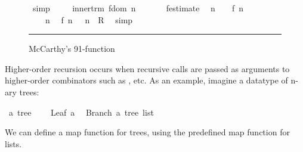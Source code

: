 \begin{isabellebody}
\begin{figure}
\begin{minipage}{0.8\textwidth}
\ simp\ %
\isanewline
\isanewline
\ \ \isamarkupfalse%
\ inner{\isacharunderscore}trm{\isacharcolon}\ {\isachardoublequoteopen}f{}{}{\isacharunderscore}dom\ {\isacharparenleft}n\ {\isacharplus}\ {}{}{\isacharparenright}{\isachardoublequoteclose}\ %
\isanewline
\ \ \isamarkupfalse%
\ f{}{}{\isacharunderscore}estimate\ \isamarkupfalse%
\ {\isachardoublequoteopen}n\ {\isacharplus}\ {}{}\ {\isacharless}\ f{}{}\ {\isacharparenleft}n\ {\isacharplus}\ {}{}{\isacharparenright}\ {\isacharplus}\ {}{}{\isachardoublequoteclose}\ \isacommand{{\isachardot}}\isamarkupfalse%
\isanewline
\ \ \isamarkupfalse%
\ {\isacharbackquoteopen}{\isasymnot}\ {}{}{}\ {\isacharless}\ n{\isacharbackquoteclose}\ \isamarkupfalse%
\ {\isachardoublequoteopen}{\isacharparenleft}f{}{}\ {\isacharparenleft}n\ {\isacharplus}\ {}{}{\isacharparenright}{\isacharcomma}\ n{\isacharparenright}\ {\isasymin}\ {\isacharquery}R{\isachardoublequoteclose}\ \isamarkupfalse%
\ simp\isanewline
{}\isamarkupfalse%
%
\endisatagproof
{\isafoldproof}%
%
\isadelimproof
%
\endisadelimproof
%
\isamarkupfalse{}
\end{minipage}
\vspace{6pt}\hrule
\caption{McCarthy's 91-function}\label{f91}
\end{figure}
%
\isamarkuptrue%
%
\begin{isamarkuptext}%
Higher-order recursion occurs when recursive calls
  are passed as arguments to higher-order combinators such as ,  etc.
  As an example, imagine a datatype of n-ary trees:%
\end{isamarkuptext}%
\isamarkuptrue%
\isamarkupfalse%
\ {\isacharprime}a\ tree\ {\isacharequal}\ \isanewline
\ \ Leaf\ {\isacharprime}a\ \isanewline
{\isacharbar}\ Branch\ {\isachardoublequoteopen}{\isacharprime}a\ tree\ list{\isachardoublequoteclose}%
\begin{isamarkuptext}%
\noindent We can define a map function for trees, using the predefined
  map function for lists.%
\end{isamarkuptext}%
\isamarkuptrue%
\isamarkupfalse%

\end{isabellebody}
